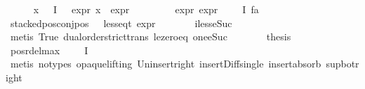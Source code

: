 \begin{isabellebody}
{\isacharminus}{\kern0pt}\isanewline
\ \ \ \ \isamarkupfalse%
\ {\isachardoublequoteopen}{\isasymforall}x{\isasymin}\ {\isacharparenleft}{\kern0pt}{\isasymPhi}\ {\isacharbackquote}{\kern0pt}\ I{\isacharparenright}{\kern0pt}\ {\isacharminus}{\kern0pt}\ {\isacharbraceleft}{\kern0pt}{\isasymphi}{\isacharbraceright}{\kern0pt}{\isachardot}{\kern0pt}\ expr{\isacharunderscore}{\kern0pt}{}\ x\ {\isacharless}{\kern0pt}\ expr{\isacharunderscore}{\kern0pt}{}\ {\isasymphi}{\isachardoublequoteclose}\isanewline
\ \ \ \ \ \ \isamarkupfalse%
\ expr{\isacharunderscore}{\kern0pt}{\isasympsi}\ expr{\isacharunderscore}{\kern0pt}{\isasymphi}\ {\isacartoucheopen}{\isasymphi}\ {\isasymin}\ {\isasymPhi}\ {\isacharbackquote}{\kern0pt}\ I{\isacartoucheclose}\ fa{\isacharunderscore}{\kern0pt}{\isasympsi}\isanewline
\ \ \ \ \ \ \isamarkupfalse%
\ {\isacartoucheopen}stacked{\isacharunderscore}{\kern0pt}pos{\isacharunderscore}{\kern0pt}conj{\isacharunderscore}{\kern0pt}pos\ {\isasymphi}\ {\isasymand}\ less{\isacharunderscore}{\kern0pt}eq{\isacharunderscore}{\kern0pt}t\ {\isacharparenleft}{\kern0pt}expr\ {\isasymphi}{\isacharparenright}{\kern0pt}\ {\isacharparenleft}{\kern0pt}{}{\isacharcomma}{\kern0pt}\ {\isasyminfinity}{\isacharcomma}{\kern0pt}\ {}{\isacharcomma}{\kern0pt}\ {}{\isacharcomma}{\kern0pt}\ {}{\isacharcomma}{\kern0pt}\ {}{\isacharparenright}{\kern0pt}{\isacartoucheclose}\ iless{\isacharunderscore}{\kern0pt}eSuc{}\isanewline
\ \ \ \ \ \ \isamarkupfalse%
\ {\isacharparenleft}{\kern0pt}metis\ True\ dual{\isacharunderscore}{\kern0pt}order{\isachardot}{\kern0pt}strict{\isacharunderscore}{\kern0pt}trans{}\ le{\isacharunderscore}{\kern0pt}zero{\isacharunderscore}{\kern0pt}eq\ one{\isacharunderscore}{\kern0pt}eSuc{\isacharparenright}{\kern0pt}\isanewline
\ \ \ \ \isamarkupfalse%
\ \isamarkupfalse%
\ {\isacharquery}{\kern0pt}thesis\ \isanewline
\ \ \ \ \ \ \isamarkupfalse%
\ pos{\isacharunderscore}{\kern0pt}r{\isacharunderscore}{\kern0pt}del{\isacharunderscore}{\kern0pt}max\ {\isacartoucheopen}{\isasymphi}\ {\isasymin}\ {\isasymPhi}\ {\isacharbackquote}{\kern0pt}\ I{\isacartoucheclose}\isanewline
\ \ \ \ \ \ \isamarkupfalse%
\ {\isacharparenleft}{\kern0pt}metis\ {\isacharparenleft}{\kern0pt}no{\isacharunderscore}{\kern0pt}types{\isacharcomma}{\kern0pt}\ opaque{\isacharunderscore}{\kern0pt}lifting{\isacharparenright}{\kern0pt}\ Un{\isacharunderscore}{\kern0pt}insert{\isacharunderscore}{\kern0pt}right\ insert{\isacharunderscore}{\kern0pt}Diff{\isacharunderscore}{\kern0pt}single\ insert{\isacharunderscore}{\kern0pt}absorb\ sup{\isacharunderscore}{\kern0pt}bot{\isacharunderscore}{\kern0pt}right{\isacharparenright}{\kern0pt}\isanewline

\end{isabellebody}
